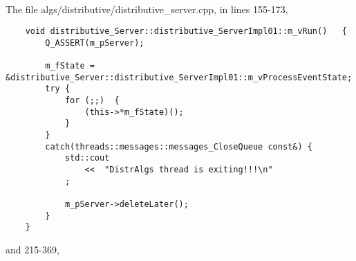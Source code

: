 \paragraph{}
The file algs/distributive/distributive\_server.cpp, in lines 155-173,
\begin{verbatim}
    void distributive_Server::distributive_ServerImpl01::m_vRun()   {
		Q_ASSERT(m_pServer);

        m_fState = &distributive_Server::distributive_ServerImpl01::m_vProcessEventState;
        try {
            for (;;)  {
                (this->*m_fState)();
            }
        }
        catch(threads::messages::messages_CloseQueue const&) {
            std::cout
                <<  "DistrAlgs thread is exiting!!!\n"
            ;

            m_pServer->deleteLater();
        }
    }
\end{verbatim}
and 215-369,

